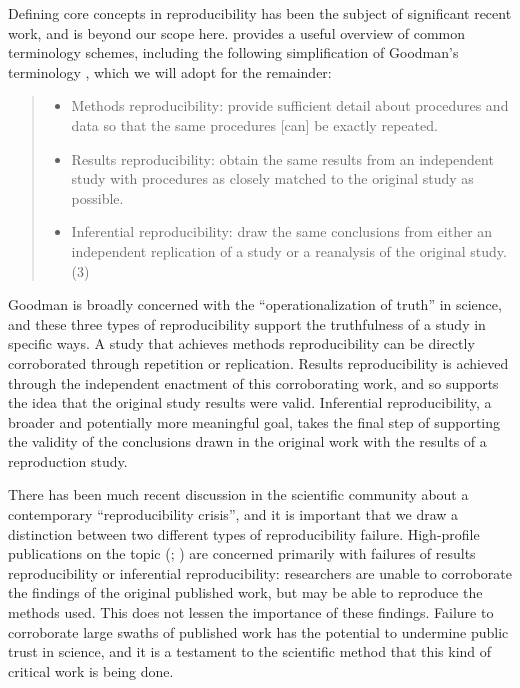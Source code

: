 Defining core concepts in reproducibility has been the subject of
significant recent work, and is beyond our scope here. \textcite{plesser_reproducibility_2018}
provides a useful overview of common terminology schemes, including the
following simplification of Goodman’s terminology \parencite{goodman_what_2016},
which we will adopt for the remainder:
\begin{quote}
    \begin{itemize}
        \item Methods reproducibility: provide sufficient detail about procedures and data so that the same procedures [can] be exactly repeated.
        \item Results reproducibility: obtain the same results from an independent study with procedures as closely matched to the original study as possible.
        \item Inferential reproducibility: draw the same conclusions from either an independent replication of a study or a reanalysis of the original study. (3)
    \end{itemize}
\end{quote}
Goodman is broadly concerned with the “operationalization of truth” in science,
and these three types of reproducibility support the truthfulness of a study in
specific ways. A study that achieves methods reproducibility can be directly
corroborated through repetition or replication. Results reproducibility is
achieved through the independent enactment of this corroborating work, and so
supports the idea that the original study results were valid. Inferential
reproducibility, a broader and potentially more meaningful goal, takes the final
step of supporting the validity of the conclusions drawn in the original work
with the results of a reproduction study.

There has been much recent discussion in the scientific community about a
contemporary “reproducibility crisis”, and it is important that we draw a
distinction between two different types of reproducibility failure. High-profile
publications on the topic (\cite{open_science_collaboration_estimating_2015}; \cite{baker_1500_2016})
are concerned primarily with failures of results reproducibility or inferential
reproducibility: researchers are unable to corroborate the findings of the
original published work, but may be able to reproduce the methods used. This
does not lessen the importance of these findings. Failure to corroborate large
swaths of published work has the potential to undermine public trust in science,
and it is a testament to the scientific method that this kind of critical work
is being done.


